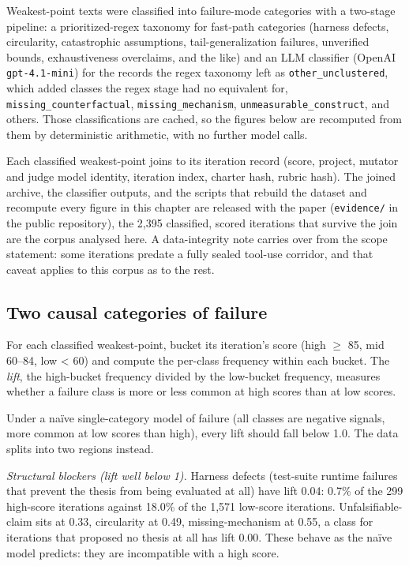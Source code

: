 \documentclass[
  11pt,
]{article}
\begin{document}
Weakest-point texts were classified into failure-mode categories with a
two-stage pipeline: a prioritized-regex taxonomy for fast-path categories
(harness defects, circularity, catastrophic assumptions,
tail-generalization failures, unverified bounds, exhaustiveness
overclaims, and the like) and an LLM classifier (OpenAI
\texttt{gpt-4.1-mini}) for the records the regex taxonomy left as
\texttt{other\_unclustered}, which added classes the regex stage had no
equivalent for, \texttt{missing\_counterfactual},
\texttt{missing\_mechanism}, \texttt{unmeasurable\_construct}, and others.
Those classifications are cached, so the figures below are recomputed from
them by deterministic arithmetic, with no further model calls.

Each classified weakest-point joins to its iteration record (score,
project, mutator and judge model identity, iteration index, charter hash,
rubric hash). The joined archive, the classifier outputs, and the scripts
that rebuild the dataset and recompute every figure in this chapter are
released with the paper (\texttt{evidence/} in the public repository), the
2,395 classified, scored iterations that survive the join are the corpus
analysed here. A data-integrity note carries over from the scope
statement: some iterations predate a fully sealed tool-use corridor, and
that caveat applies to this corpus as to the rest.

\subsection{Two causal categories of
failure}\label{two-causal-categories-of-failure}

For each classified weakest-point, bucket its iteration's score (high
\(\geq\) 85, mid 60--84, low \textless{} 60) and compute the per-class
frequency within each bucket. The \emph{lift}, the high-bucket
frequency divided by the low-bucket frequency, measures whether a
failure class is more or less common at high scores than at low scores.

Under a naïve single-category model of failure (all classes are negative
signals, more common at low scores than high), every lift should fall
below 1.0. The data splits into two regions instead.

\emph{Structural blockers (lift well below 1).} Harness defects
(test-suite runtime failures that prevent the thesis from being evaluated
at all) have lift 0.04: 0.7\% of the 299 high-score iterations against
18.0\% of the 1,571 low-score iterations. Unfalsifiable-claim sits at 0.33,
circularity at 0.49, missing-mechanism at 0.55, a class for iterations that
proposed no thesis at all has lift 0.00. These behave as the naïve model
predicts: they are incompatible with a high score.
\end{document}
